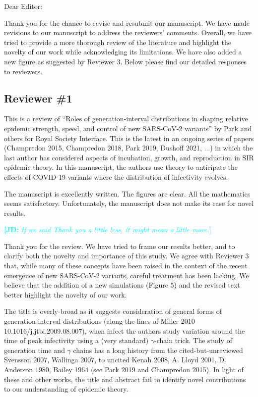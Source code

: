 \documentclass[12pt]{article}
\newcommand{\rev}{\subsection*}
\newcommand{\revtext}{\textsf}
\newcommand{\comment}[3]{\textcolor{#1}{\textbf{[#2: }\textsl{#3}\textbf{]}}}
\newcommand{\jd}[1]{\comment{cyan}{JD}{#1}}
\begin{document}
\noindent Dear Editor:

Thank you for the chance to revise and resubmit our manuscript. 
We have made revisions to our manuscript to address the reviewers' comments.
Overall, we have tried to provide a more thorough review of the literature and highlight the novelty of our work while acknowledging its limitations.
We have also added a new figure as suggested by Reviewer 3.
Below please find our detailed responses to reviewers.

\rev{Reviewer \#1}

\revtext{This is a review of ``Roles of generation-interval distributions in shaping relative epidemic strength, speed, and control of new SARS-CoV-2 variants'' by Park and others for Royal Society Interface.  This is the latest in an ongoing series of papers (Champredon 2015, Champredon 2018, Park 2019, Dushoff 2021, ...) in which the last author has considered aspects of incubation, growth, and reproduction in SIR epidemic theory.  In this manuscript, the authors use theory to anticipate the effects of COVID-19 variants where the distribution of infectivity evolves.}

\revtext{The manuscript is excellently written. The figures are clear.  All the mathematics seems satisfactory.  Unfortunately, the manuscript does not make its case for novel results.}

\jd{If we said Thank you a little less, it might mean a little more.}

Thank you for the review.
We have tried to frame our results better, and to clarify both the novelty and importance of this study.
We agree with Reviewer 3 that, while many of these concepts have been raised in the context of the recent emergence of new SARS-CoV-2 variants, careful treatment has been lacking. 
We believe that the addition of a new simulations (Figure 5) and the revised text better highlight the novelty of our work.

\revtext{The title is overly-broad as it suggests consideration of general forms of generation interval distributions (along the lines of Miller 2010 10.1016/j.jtbi.2009.08.007), when infect the authors study variation around the time of peak infectivity using a (very standard) $\gamma$-chain trick.  The study of generation time and $\gamma$ chains has a long history from the cited-but-unreviewed Svensson 2007, Wallinga 2007, to uncited Kenah 2008, A.  Lloyd 2001, D. Anderson 1980, Bailey 1964 (see Park 2019 and Champredon 2015).  In light of these and other works, the title and abstract fail to identify novel contributions to our understanding of epidemic theory.}
\end{document}
